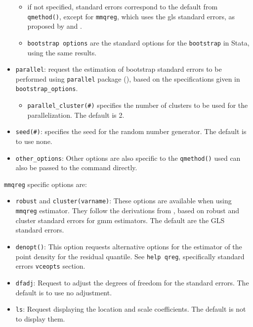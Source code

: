 \documentclass[bib]{statapress}
\providecommand{\tightlist}{%
  \setlength{\itemsep}{0pt}\setlength{\parskip}{0pt}}\usepackage{longtable,booktabs,array}
\begin{document}
\begin{itemize}
  \begin{itemize}
  \tightlist
  \item
    if not specified, standard errors correspond to the default from
    \texttt{qmethod()}, except for \texttt{mmqreg}, which uses the gls
    standard errors, as proposed by \citet{mss2019} and
    \citet{riosavila2024}.
  \item
    \texttt{bootstrap\ options} are the standard options for the
    \texttt{bootstrap} in Stata, using the same results.
  \end{itemize}
\item
  \texttt{parallel}: request the estimation of bootstrap standard errors
  to be performed using \texttt{parallel} package (\citet{vegayon2019}),
  based on the specifications given in \texttt{bootstrap\_options}.

  \begin{itemize}
  \tightlist
  \item
    \texttt{parallel\_cluster(\#)} specifies the number of clusters to
    be used for the parallelization. The default is 2.
  \end{itemize}
\item
  \texttt{seed(\#)}: specifies the seed for the random number generator.
  The default is to use none.
\item
  \texttt{other\_options}: Other options are also specific to the
  \texttt{qmethod()} used can also be passed to the command directly.
\end{itemize}

\texttt{mmqreg} specific options are:

\begin{itemize}
\tightlist
\item
  \texttt{robust} and \texttt{cluster(varname)}: These options are
  available when using \texttt{mmqreg} estimator. They follow the
  derivations from \citet{riosavila2024}, based on robust and cluster
  standard errors for gmm estimators. The default are the GLS standard
  errors.
\item
  \texttt{denopt()}: This option requests alternative options for the
  estimator of the point density for the residual quantile. See
  \texttt{help\ qreg}, specifically standard errors \texttt{vceopts}
  section.
\item
  \texttt{dfadj}: Request to adjust the degrees of freedom for the
  standard errors. The default is to use no adjustment.
\item
  \texttt{ls}: Request displaying the location and scale coefficients.
  The default is not to display them.
\end{itemize}
\end{document}
